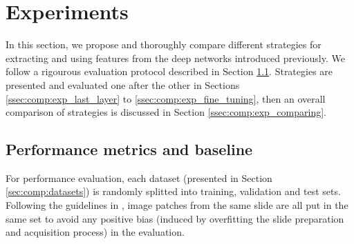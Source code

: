 




\section{Experiments}


In this section, we propose and thoroughly compare different strategies for extracting and using features from the deep networks introduced previously. We follow a rigourous evaluation protocol described in Section \ref{ssec:comp:protocol}. Strategies are presented and evaluated one after the other in Sections \ref{ssec:comp:exp_last_layer} to \ref{ssec:comp:exp_fine_tuning}, then an overall comparison of strategies is discussed in Section \ref{ssec:comp:exp_comparing}.



\subsection{Performance metrics and baseline}
\label{ssec:comp:protocol}
For performance evaluation, each dataset (presented in Section \ref{sec:comp:datasets}) is randomly splitted into training, validation and test sets. Following the guidelines in \parencite{maree2017need}, image patches from the same slide are all put in the same set to avoid any positive bias (induced by overfitting the slide preparation and acquisition process) in the evaluation. %


